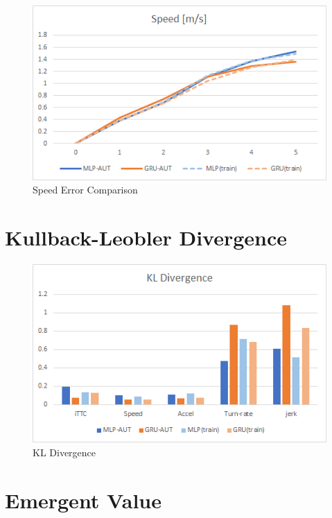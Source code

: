 \begin{figure}[H]
\begin{center}
\includegraphics[width=14cm]{./figures/graph_speed.png}
\caption{Speed Error Comparison}
\label{fig:graph_speed}
\end{center}
\end{figure}


\section{Kullback-Leobler Divergence}


\begin{figure}[H]
\begin{center}
\includegraphics[width=14cm]{./figures/graph_kldivergence.png}
\caption{KL Divergence}
\label{fig:graph_kldivergence}
\end{center}
\end{figure}


\section{Emergent Value}

